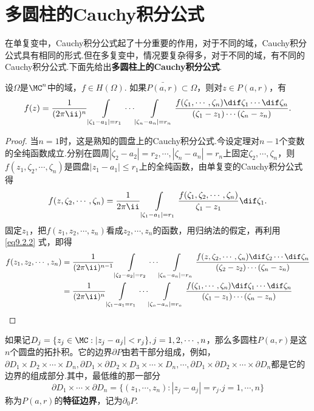 \section{多圆柱的Cauchy积分公式\label{sec9.2}}
在单复变中，Cauchy积分公式起了十分重要的作用，对于不同的域，Cauchy积分公式具有相同的形式.但在多复变中，情况要复杂得多，对于不同的域，有不同的Cauchy积分公式.下面先给出\textbf{多圆柱上的Cauchy积分公式}.
\begin{theorem}\label{thm9.2.1}
设$\Omega$是$\MC^n$中的域，$f\in H(\Omega)$. 如果$\bar{P(a,r)}\subset \Omega$，则对$z\in P(a,r)$，有
\begin{equation}\label{eq9.2.1}
f(z)=\frac1{(2\pi\ii)^n}\int\limits_{|\zeta_1-a_1|=r_1}\cdots\int\limits_{|\zeta_n-a_n|=r_n}
\frac{f(\zeta_1,\cdots,\zeta_n)\dif \zeta_1\cdots\dif \zeta_n}{(\zeta_1-z_1)\cdots(\zeta_n-z_n)}.
\end{equation}
\end{theorem}
\begin{proof}
当$n=1$时，这是熟知的圆盘上的Cauchy积分公式.今设定理对$n-1$个变数的全纯函数成立.分别在圆周$|\zeta_2-a_2|=r_2,\cdots,|\zeta_n-a_n|=r_n$上固定$\zeta_2,\cdots,\zeta_n$，则$f(z_1,\zeta_2,\cdots,\zeta_n)$是圆盘$|z_1-a_1|\le r_1$上的全纯函数，由单复变的Cauchy积分公式得
\begin{equation}\label{eq9.2.2}
f(z,\zeta_2,\cdots,\zeta_n)=\frac1{2\pi\ii}\int\limits_{|\zeta_1-a_1|=r_1}
\frac{f(\zeta_1,\zeta_2,\cdots,\zeta_n)}{\zeta_1-z_1}\dif \zeta_1.
\end{equation}
固定$z_1$，把$f(z_1,z_2,\cdots,z_n)$看成$z_2,\cdots,z_n$的函数，用归纳法的假定，再利用 \eqref{eq9.2.2} 式，即得
\begin{align*}
  f(z_1,z_2,\cdots,z_n)&=\frac1{(2\pi\ii)^{n-1}}\int\limits_{|\zeta_2-a_2|=r_2}\cdots\int\limits_{|\zeta_n-a_n|=r_n}
  \frac{f(z,\zeta_2,\cdots,\zeta_n)\dif \zeta_2\cdots
  \dif \zeta_n}{(\zeta_2-z_2)\cdots(\zeta_n-z_n)}\\
  & = \frac1{(2\pi\ii)^n}\int\limits_{|\zeta_1-a_1=r_1} \cdots\int\limits_{|\zeta_n-a_n|=r_n}
  \frac{f(\zeta_1,\cdots,\zeta_n)\dif \zeta_1\cdots
  \dif \zeta_n}{(\zeta_1-z_1)\cdots(\zeta_n-z_n)} \qedhere
\end{align*}
\end{proof}

如果记$D_j=\{z_j\in\MC:|z_j-a_j|<r_j\},j=1,2,\cdots,n$，那么多圆柱$P(a,r)$是这$n$个圆盘的拓扑积。它的边界$\partial P$由若干部分组成，例如，$\partial D_1\times D_2\times\cdots\times D_n,\partial D_1\times\partial D_2\times D_3\times\cdots\times D_n,\cdots,\partial D_1\times\partial D_2\times\cdots\times\partial D_n$都是它的边界的组成部分.其中，最低维的那一部分
\[\partial D_1\times\cdots\times\partial D_n=\{(z_1,\cdots,z_n):|z_j-a_j|=r_j.j=1,\cdots,n\}\]
称为$P(a,r)$的\textbf{特征边界}，记为$\partial_0P$.

